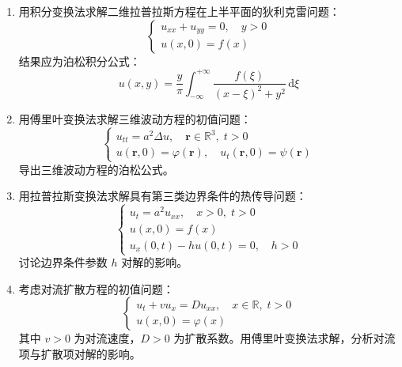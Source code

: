 \begin{enumerate}[resume]
    \item 用积分变换法求解二维拉普拉斯方程在上半平面的狄利克雷问题：
    \begin{equation}
        \begin{cases}
            u_{xx} + u_{yy} = 0, \quad y > 0 \\
            u(x, 0) = f(x)
        \end{cases}
    \end{equation}
    结果应为泊松积分公式：
    \begin{equation}
        u(x, y) = \frac{y}{\pi}\int_{-\infty}^{+\infty} \frac{f(\xi)}{(x-\xi)^2 + y^2}\,\mathrm{d}\xi
    \end{equation}
    
    \item 用傅里叶变换法求解三维波动方程的初值问题：
    \begin{equation}
        \begin{cases}
            u_{tt} = a^2 \Delta u, \quad \mathbf{r} \in \mathbb{R}^3, \; t > 0 \\
            u(\mathbf{r}, 0) = \varphi(\mathbf{r}), \quad u_t(\mathbf{r}, 0) = \psi(\mathbf{r})
        \end{cases}
    \end{equation}
    导出三维波动方程的泊松公式。
    
    \item 用拉普拉斯变换法求解具有第三类边界条件的热传导问题：
    \begin{equation}
        \begin{cases}
            u_t = a^2 u_{xx}, \quad x > 0, \; t > 0 \\
            u(x, 0) = f(x) \\
            u_x(0, t) - hu(0, t) = 0, \quad h > 0
        \end{cases}
    \end{equation}
    讨论边界条件参数 $h$ 对解的影响。
    
    \item 考虑对流扩散方程的初值问题：
    \begin{equation}
        \begin{cases}
            u_t + v u_x = D u_{xx}, \quad x \in \mathbb{R}, \; t > 0 \\
            u(x, 0) = \varphi(x)
        \end{cases}
    \end{equation}
    其中 $v > 0$ 为对流速度，$D > 0$ 为扩散系数。用傅里叶变换法求解，分析对流项与扩散项对解的影响。
\end{enumerate}
